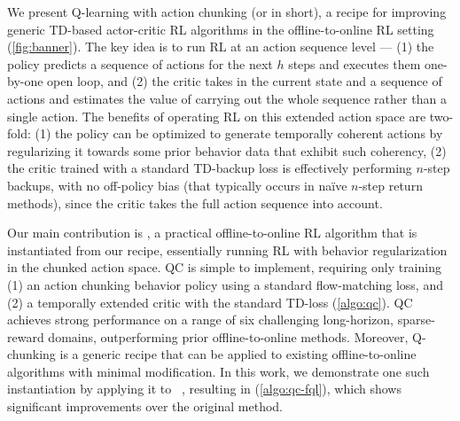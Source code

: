 We present Q-learning with action chunking (or  in short), a recipe for improving generic TD-based actor-critic RL algorithms in the offline-to-online RL setting (\cref{fig:banner}). The key idea is to run RL at an action sequence level --- (1) the policy predicts a sequence of actions for the next $h$ steps and executes them one-by-one open loop, and (2) the critic takes in the current state and a sequence of actions and estimates the value of carrying out the whole sequence rather than a single action. The benefits of operating RL on this extended action space are two-fold: (1) the policy can be optimized to generate temporally coherent actions by regularizing it towards some prior behavior data that exhibit such coherency, (2) the critic trained with a standard TD-backup loss is effectively performing $n$-step backups, with no off-policy bias (that typically occurs in na\"ive $n$-step return methods), since the critic takes the full action sequence into account. 

Our main contribution is , a practical offline-to-online RL algorithm that is instantiated from our  recipe, essentially running RL with behavior regularization in the chunked action space. QC is simple to implement, requiring only training (1) an action chunking behavior policy using a standard flow-matching loss, and (2) a temporally extended critic with the standard TD-loss (\cref{algo:qc}). QC achieves strong performance on a range of six challenging long-horizon, sparse-reward domains, outperforming prior offline-to-online methods. Moreover, Q-chunking is a generic recipe that can be applied to existing offline-to-online algorithms with minimal modification. In this work, we demonstrate one such instantiation by applying it to ~\citep{park2025flow}, resulting in  (\cref{algo:qc-fql}), which shows significant improvements over the original method.





































